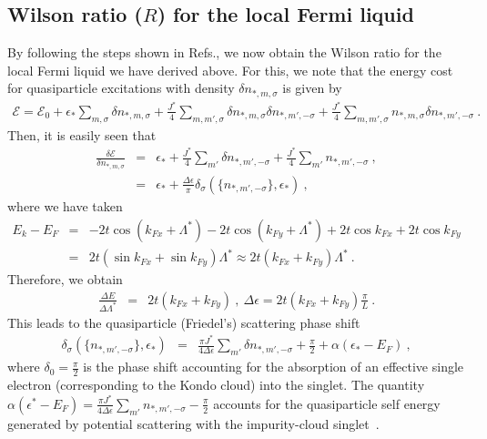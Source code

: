 \documentclass[aps,prb,preprint,groupedaddress]{revtex4-2}
\begin{document}
\subsection{Wilson ratio ($R$) for the local Fermi liquid}
By following the steps shown in Refs.\cite{nozieres1974fermi,coleman2015}, we now obtain the Wilson ratio for the local Fermi liquid we have derived above. For this, we note that the energy cost for quasiparticle excitations with density $\delta n_{*,m,\sigma}$ is given by
\begin{eqnarray}
\mathcal{E}=\mathcal{E}_{0}+\epsilon_{*}\sum_{m,\sigma}\delta n_{*,m,\sigma}+\frac{J^{*}}{4}\sum_{m,m',\sigma}\delta n_{*,m,\sigma}\delta n_{*,m',-\sigma}+\frac{J^{*}}{4}\sum_{m,m',\sigma}n_{*,m,\sigma}\delta n_{*,m',-\sigma}~.
\label{effHamIOM}
\end{eqnarray}
Then, it is easily seen that 
\begin{eqnarray}
\frac{\delta\mathcal{E}}{\delta n_{*,m,\sigma}}&=&\epsilon_{*}+\frac{J^{*}}{4}\sum_{m'}\delta n_{*,m',-\sigma}+\frac{J^{*}}{4}\sum_{m'}n_{*,m',-\sigma}~,\nonumber\\
&=&\epsilon_{*}+\frac{\Delta\epsilon}{\pi}\delta_{\sigma}(\lbrace n_{*,m',-\sigma}\rbrace,\epsilon_{*})~,
\end{eqnarray}
where we have taken
\begin{eqnarray}
E_{k}-E_{F}&=&-2t\cos(k_{Fx}+\Lambda^{*})-2t\cos(k_{Fy}+\Lambda^{*})+2t\cos k_{Fx}+2t\cos k_{Fy}\nonumber\\
&=&2t(\sin k_{Fx}+\sin k_{Fy})\Lambda^{*}\approx 2t(k_{Fx}+k_{Fy})\Lambda^{*}~.
\end{eqnarray}
Therefore, we obtain
\begin{eqnarray}
\frac{\Delta E}{\Delta \Lambda^{*}}&=&2t(k_{Fx}+k_{Fy})~,~
\Delta \epsilon=2t(k_{Fx}+k_{Fy})\frac{\pi}{L}~.
\end{eqnarray}
This leads to the quasiparticle (Friedel's) scattering phase shift 
\begin{eqnarray}
\delta_{\sigma}(\lbrace n_{*,m',-\sigma}\rbrace,\epsilon_{*})&=&\frac{\pi J^{*}}{4\Delta\epsilon}\sum_{m'}\delta n_{*,m',-\sigma}+\frac{\pi}{2}+\alpha(\epsilon_{*}-E_{F})~,
\end{eqnarray}
where $\delta_{0}=\frac{\pi}{2}$ is the phase shift accounting for the absorption of an effective single electron (corresponding to the Kondo cloud) into the singlet. The quantity $\alpha(\epsilon^{*}-E_{F})=\frac{\pi J^{*}}{4\Delta\epsilon}\sum_{m'}n_{*,m',-\sigma}-\frac{\pi}{2}$ accounts for the quasiparticle self energy generated by potential scattering with the impurity-cloud singlet~\cite{martin-physrevlett.48.362,nozieres1974fermi,coleman2015}.
\end{document}
